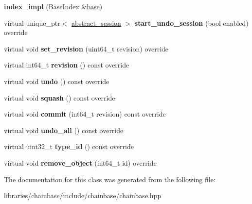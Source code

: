 \begin{DoxyCompactItemize}
\item 
\mbox{\label{classchainbase_1_1index__impl_ad0e17e7fc55ae28d3c24b6431cfb88d9}} 
{\bfseries index\+\_\+impl} (Base\+Index \&\mbox{\hyperlink{structbase}{base}})
\item 
\mbox{\label{classchainbase_1_1index__impl_adff445f6e35c566b9d341c9d4c0ca76d}} 
virtual unique\+\_\+ptr$<$ \mbox{\hyperlink{classchainbase_1_1abstract__session}{abstract\+\_\+session}} $>$ {\bfseries start\+\_\+undo\+\_\+session} (bool enabled) override
\item 
\mbox{\label{classchainbase_1_1index__impl_aea66d0d68a1b77c603d04fdec5708d9b}} 
virtual void {\bfseries set\+\_\+revision} (uint64\+\_\+t revision) override
\item 
\mbox{\label{classchainbase_1_1index__impl_a58bec3224f3613f34590a98120121621}} 
virtual int64\+\_\+t {\bfseries revision} () const override
\item 
\mbox{\label{classchainbase_1_1index__impl_a0d8a7b495849376d70abedd338cd0ea8}} 
virtual void {\bfseries undo} () const override
\item 
\mbox{\label{classchainbase_1_1index__impl_aadb98ff6c524d6013ffccf80b50936b8}} 
virtual void {\bfseries squash} () const override
\item 
\mbox{\label{classchainbase_1_1index__impl_a750b8876694e1d659d9d06a269463075}} 
virtual void {\bfseries commit} (int64\+\_\+t revision) const override
\item 
\mbox{\label{classchainbase_1_1index__impl_ac7d2724a774bbf18eb804d7f3ebbb76e}} 
virtual void {\bfseries undo\+\_\+all} () const override
\item 
\mbox{\label{classchainbase_1_1index__impl_a15c607949abbedfc0a5761144cd61729}} 
virtual uint32\+\_\+t {\bfseries type\+\_\+id} () const override
\item 
\mbox{\label{classchainbase_1_1index__impl_abca36d34cfd673d5602aed01fce2437e}} 
virtual void {\bfseries remove\+\_\+object} (int64\+\_\+t id) override
\end{DoxyCompactItemize}


The documentation for this class was generated from the following file\+:\begin{DoxyCompactItemize}
\item 
libraries/chainbase/include/chainbase/chainbase.\+hpp\end{DoxyCompactItemize}
